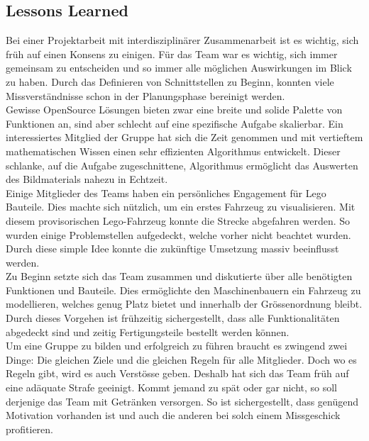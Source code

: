 \subsection{Lessons Learned}
Bei einer Projektarbeit mit interdisziplinärer Zusammenarbeit ist es wichtig, sich früh auf einen Konsens zu einigen.
Für das Team war es wichtig, sich immer gemeinsam zu entscheiden und so immer alle möglichen Auswirkungen im Blick zu haben.
Durch das Definieren von Schnittstellen zu Beginn, konnten viele Missverständnisse schon in der Planungsphase bereinigt werden.
\\[0.2cm]
Gewisse OpenSource Lösungen bieten zwar eine breite und solide Palette von Funktionen an, sind aber schlecht auf eine spezifische Aufgabe skalierbar.
Ein interessiertes Mitglied der Gruppe hat sich die Zeit genommen und mit vertieftem mathematischen Wissen einen sehr effizienten Algorithmus entwickelt.
Dieser schlanke, auf die Aufgabe zugeschnittene, Algorithmus ermöglicht das Auswerten des Bildmaterials nahezu in Echtzeit.
\\[0.2cm]
Einige Mitglieder des Teams haben ein persönliches Engagement für Lego Bauteile. Dies machte sich nützlich, um ein erstes Fahrzeug zu visualisieren.
Mit diesem provisorischen Lego-Fahrzeug konnte die Strecke abgefahren werden. So wurden einige Problemstellen aufgedeckt, welche vorher nicht beachtet wurden. Durch diese simple Idee konnte die zukünftige Umsetzung massiv beeinflusst werden.
\\[0.2cm]
Zu Beginn setzte sich das Team zusammen und diskutierte über alle benötigten Funktionen und Bauteile.
Dies ermöglichte den Maschinenbauern ein Fahrzeug zu modellieren, welches genug Platz bietet und innerhalb der Grössenordnung bleibt.
Durch dieses Vorgehen ist frühzeitig sichergestellt, dass alle Funktionalitäten abgedeckt sind und zeitig Fertigungsteile bestellt werden können.
\\[0.2cm]
Um eine Gruppe zu bilden und erfolgreich zu führen braucht es zwingend zwei Dinge:
Die gleichen Ziele und die gleichen Regeln für alle Mitglieder.
Doch wo es Regeln gibt, wird es auch Verstösse geben. Deshalb hat sich das Team früh auf eine adäquate Strafe geeinigt.
Kommt jemand zu spät oder gar nicht, so soll derjenige das Team mit Getränken versorgen.
So ist sichergestellt, dass genügend Motivation vorhanden ist und auch die anderen bei solch einem Missgeschick profitieren.